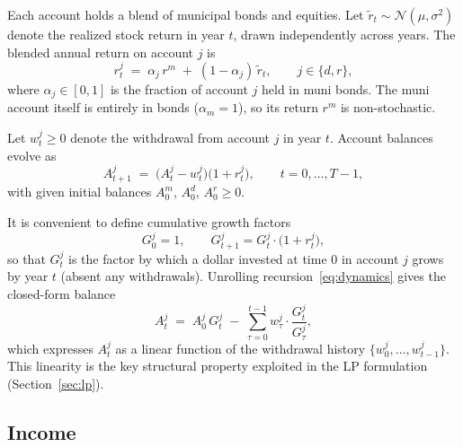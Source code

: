 \documentclass[12pt]{article}
\begin{document}
Each account holds a blend of municipal bonds and equities. Let
$\tilde{r}_t \sim \mathcal{N}(\mu, \sigma^2)$ denote the realized stock
return in year $t$, drawn independently across years. The blended annual
return on account $j$ is
\begin{equation}
  r^j_t \;=\; \alpha_j\,r^m \;+\; (1 - \alpha_j)\,\tilde{r}_t,
  \qquad j \in \{d, r\},
  \label{eq:blended}
\end{equation}
where $\alpha_j \in [0,1]$ is the fraction of account $j$ held in muni bonds.
The muni account itself is entirely in bonds ($\alpha_m = 1$), so its return
$r^m$ is non-stochastic.

Let $w^j_t \geq 0$ denote the withdrawal from account $j$ in year $t$.
Account balances evolve as
\begin{equation}
  A^j_{t+1} \;=\; \bigl(A^j_t - w^j_t\bigr)\bigl(1 + r^j_t\bigr),
  \qquad t = 0, \ldots, T-1,
  \label{eq:dynamics}
\end{equation}
with given initial balances $A^m_0$, $A^d_0$, $A^r_0 \geq 0$.

It is convenient to define cumulative growth factors
\begin{equation}
  G^j_0 = 1, \qquad
  G^j_{t+1} = G^j_t \cdot \bigl(1 + r^j_t\bigr),
  \label{eq:growthfactor}
\end{equation}
so that $G^j_t$ is the factor by which a dollar invested at time 0 in account
$j$ grows by year $t$ (absent any withdrawals). Unrolling
recursion~\eqref{eq:dynamics} gives the closed-form balance
\begin{equation}
  A^j_t \;=\; A^j_0\,G^j_t
          \;-\; \sum_{\tau=0}^{t-1} w^j_\tau \cdot \frac{G^j_t}{G^j_\tau},
  \label{eq:balance_lp}
\end{equation}
which expresses $A^j_t$ as a linear function of the withdrawal history
$\{w^j_0, \ldots, w^j_{t-1}\}$. This linearity is the key structural property
exploited in the LP formulation (Section~\ref{sec:lp}).

\subsection{Income}
\label{sec:income}
\end{document}
